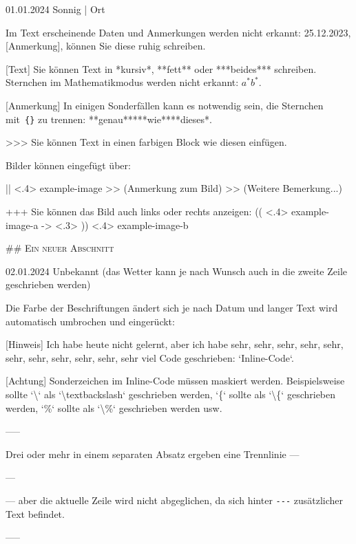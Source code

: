 \documentclass[11pt, paperstyle=light yellow, color entry, day-month-year,
  title in boldface, title in sffamily, use style = classical]{jwjournal}
\begin{document}
01.01.2024 Sonnig | Ort

  Im Text erscheinende Daten und Anmerkungen werden nicht erkannt: 25.12.2023, [Anmerkung], können Sie diese ruhig schreiben.

  [Text]
    Sie können Text in *kursiv*, **fett** oder ***beides*** schreiben.
    \\
    Sternchen im Mathematikmodus werden nicht erkannt: $a^* b^*$.

  [Anmerkung] In einigen Sonderfällen kann es notwendig sein, die Sternchen mit~\texttt{\{\}} zu trennen: **genau**{}***wie***{}*dieses*.

  >>> Sie können Text in einen farbigen Block wie diesen einfügen.

  Bilder können eingefügt über:

  || <.4> {example-image} %
  >> (Anmerkung zum Bild)
  >> (Weitere Bemerkung...)

  +++
  Sie können das Bild auch links oder rechts anzeigen:
  (( <.4> {example-image-a} %
  -> <.3> %
  )) <.4> {example-image-b} %


## {\textsc{Ein neuer Abschnitt}}

02.01.2024
Unbekannt (das Wetter kann je nach Wunsch auch in die zweite Zeile geschrieben werden)

  Die Farbe der Beschriftungen ändert sich je nach Datum und langer Text wird automatisch umbrochen und eingerückt:

  [Hinweis] Ich habe heute nicht gelernt, aber ich habe sehr, sehr, sehr, sehr, sehr, sehr, sehr, sehr, sehr, sehr, sehr viel Code geschrieben: `Inline-Code`.

  [Achtung] Sonderzeichen im Inline-Code müssen maskiert werden. Beispielsweise sollte `\textbackslash` als `\textbackslash textbackslash` geschrieben werden, `\{` sollte als `\textbackslash\{` geschrieben werden, `\%` sollte als `\textbackslash\%` geschrieben werden usw.

  -----

  Drei oder mehr \textquote{\texttt{-}} in einem separaten Absatz ergeben eine Trennlinie ---

  ---

  --- aber die aktuelle Zeile wird nicht abgeglichen, da sich hinter \texttt{-}\texttt{-}\texttt{-} zusätzlicher Text befindet.

  -----
\end{document}
